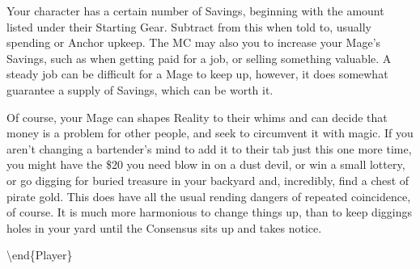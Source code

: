 \documentclass[
  oneside,
  statementpaper,
  9pt]{memoir}
\begin{document}
Your character has a certain number of Savings, beginning with the
amount listed under their Starting Gear. Subtract from this when told
to, usually spending or Anchor upkeep. The MC may also you to increase
your Mage's Savings, such as when getting paid for a job, or selling
something valuable. A steady job can be difficult for a Mage to keep up,
however, it does somewhat guarantee a supply of Savings, which can be
worth it.

Of course, your Mage can shapes Reality to their whims and can decide
that money is a problem for other people, and seek to circumvent it with
magic. If you aren't changing a bartender's mind to add it to their tab
just this one more time, you might have the \$20 you need blow in on a
dust devil, or win a small lottery, or go digging for buried treasure in
your backyard and, incredibly, find a chest of pirate gold. This does
have all the usual rending dangers of repeated coincidence, of course.
It is much more harmonious to change things up, than to keep diggings
holes in your yard until the Consensus sits up and takes notice.

\textbackslash end\{Player\}
\end{document}
